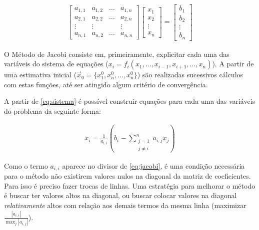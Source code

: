 \documentclass[final,5p]{elsarticle}
\numberwithin{equation}{section}
\begin{document}
        \begin{align}
            \left[
                \begin{array}{cccc}
                    a_{1,1}    & a_{1,2}    & \ldots & a_{1,n} \\
                    a_{2,1}    & a_{2,2}    & \ldots & a_{2,n} \\
                    \vdots     & \vdots     &        & \vdots  \\
                    a_{n,1}    & a_{n,2}    & \ldots & a_{n,n}
                \end{array}
            \right]
            \begin{bmatrix}
                x_{1}  \\
                x_{2}  \\
                \vdots \\
                x_{n}
            \end{bmatrix}
            =
            \begin{bmatrix}
                b_{1}  \\
                b_{2}  \\
                \vdots \\
                b_{n}
            \end{bmatrix}
            \label{eq:sistema}
        \end{align}

        O Método de Jacobi consiste em, primeiramente, explicitar cada uma das variáveis do sistema de equações ($x_i = f_i(x_1,\ldots,x_{i-1},x_{i+1},\ldots,x_n)$). A partir de uma estimativa inicial ($\vec{x}_0 = \{x_1^0,x_n^0,\ldots,x_n^0\}$) são realizadas sucessivos cálculos com estas funções, até ser atingido algum critério de convergência\cite{burden2016analise}.

        A partir de \ref{eq:sistema} é possível construir equações para cada uma das variáveis do problema da seguinte forma:

        \begin{align}
            x_i = \frac{1}{a_{i,i}} ( b_i - \sum^{n}_{\substack{j=1 \\ j \neq i}} a_{i,j} x_j ) \label{eq:jacobi}
        \end{align}

        Como o termo $a_{i,i}$ aparece no divisor de \ref{eq:jacobi}, é uma condição necessária para o método não existirem valores nulos na diagonal da matriz de coeficientes. Para isso é preciso fazer trocas de linhas. Uma estratégia para melhorar o método é buscar ter valores altos na diagonal, ou buscar colocar valores na diagonal \emph{relativamente} altos com relação aos demais termos da mesma linha (maximizar $\frac{|a_{i,i}|}{\max_j |a_{i,j}|}$).
\end{document}
